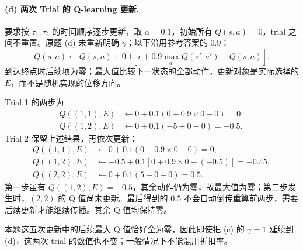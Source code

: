 \begin{checkedsolution}
\paragraph{(d) 两次 Trial 的 Q-learning 更新.}
要求按 $\tau_1,\tau_2$ 的时间顺序逐步更新，取 $\alpha=0.1$，初始所有 $Q(s,a)=0$，trial 之间不重置。原题 (d) 未重新明确 $\gamma$；以下沿用参考答案的 $0.9$：
\[
  Q(s,a)\leftarrow Q(s,a)+0.1
  \left[r+0.9\max_{a'}Q(s',a')-Q(s,a)\right].
\]
到达终点时后续项为零；最大值比较下一状态的全部动作。更新对象是实际选择的 $E$，而不是随机实现的位移方向。

Trial 1 的两步为
\[
\begin{aligned}
  Q((1,1),E)&\leftarrow0+0.1(0+0.9\times0-0)=0,\\
  Q((1,2),E)&\leftarrow0+0.1(-5+0-0)=-0.5.
\end{aligned}
\]
Trial 2 保留上述结果，再依次更新：
\[
\begin{aligned}
  Q((1,1),E)&\leftarrow0+0.1(0+0.9\times0-0)=0,\\
  Q((1,2),E)&\leftarrow-0.5+0.1[0+0.9\times0-(-0.5)]=-0.45,\\
  Q((2,2),E)&\leftarrow0+0.1(5+0-0)=0.5.
\end{aligned}
\]
第一步虽有 $Q((1,2),E)=-0.5$，其余动作仍为零，故最大值为零；第二步发生时，$(2,2)$ 的 Q 值尚未更新。最后得到的 $0.5$ 不会自动倒传重算前两步，需要后续更新才能继续传播。其余 Q 值均保持零。

本题这五次更新中的后续最大 Q 值恰好全为零，因此即使把 (c) 的 $\gamma=1$ 延续到 (d)，这两次 trial 的数值也不变；一般情况下不能混用折扣率。
\end{checkedsolution}

